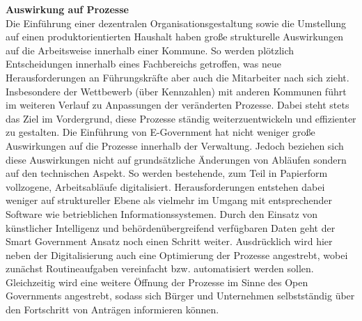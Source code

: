 \textbf{Auswirkung auf Prozesse}\\
Die Einführung einer dezentralen Organisationsgestaltung sowie die Umstellung auf einen produktorientierten Haushalt haben große strukturelle Auswirkungen auf die Arbeitsweise innerhalb einer Kommune.
So werden plötzlich Entscheidungen innerhalb eines Fachbereichs getroffen, was neue Herausforderungen an Führungskräfte aber auch die Mitarbeiter nach sich zieht.
Insbesondere der Wettbewerb (über Kennzahlen) mit anderen Kommunen führt im weiteren Verlauf zu Anpassungen der veränderten Prozesse.
Dabei steht stets das Ziel im Vordergrund, diese Prozesse ständig weiterzuentwickeln und effizienter zu gestalten.
Die Einführung von E-Government hat nicht weniger große Auswirkungen auf die Prozesse innerhalb der Verwaltung.
Jedoch beziehen sich diese Auswirkungen nicht auf grundsätzliche Änderungen von Abläufen sondern auf den technischen Aspekt.
So werden bestehende, zum Teil in Papierform vollzogene, Arbeitsabläufe digitalisiert.
Herausforderungen entstehen dabei weniger auf struktureller Ebene als vielmehr im Umgang mit entsprechender Software wie betrieblichen Informationssystemen.
Durch den Einsatz von künstlicher Intelligenz und behördenübergreifend verfügbaren Daten geht der Smart Government Ansatz noch einen Schritt weiter.
Ausdrücklich wird hier neben der Digitalisierung auch eine Optimierung der Prozesse angestrebt, wobei zunächst Routineaufgaben vereinfacht bzw. automatisiert werden sollen.
Gleichzeitig wird eine weitere Öffnung der Prozesse im Sinne des Open Governments angestrebt, sodass sich Bürger und Unternehmen selbstständig über den Fortschritt von Anträgen informieren können.



